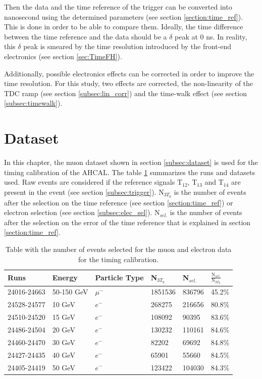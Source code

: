 Then the data and the time reference of the trigger can be converted into nanosecond using the determined parameters (see section \ref{section:time_ref}). This is done in order to be able to compare them. Ideally, the time difference between the time reference and the data should be a $\delta$ peak at 0 ns. In reality, this $\delta$ peak is smeared by the time resolution introduced by the front-end electronics (see section \ref{sec:TimeFH}).

Additionally, possible electronics effects can be corrected in order to improve the time resolution. For this study, two effects are corrected, the non-linearity of the TDC ramp (see section \ref{subsec:lin_corr}) and the time-walk effect (see section \ref{subsec:timewalk}).

\section{Dataset}

In this chapter, the muon dataset shown in section \ref{subsec:dataset} is used for the timing calibration of the AHCAL. The table \ref{table:mu_elec_runs} summarizes the runs and datasets used. Raw events are considered if the reference signals T$_{12}$, T$_{13}$ and T$_{14}$ are present in the event (see section \ref{subsec:trigger}). N$_{3 T_0}$ is the number of events after the selection on the time reference (see section \ref{section:time_ref}) or electron selection (see section \ref{subsec:elec_sel}). N$_{sel.}$ is the number of events after the selection on the error of the time reference that is explained in section \ref{section:time_ref}.

\begin{table}[htb!]
	\centering
	\caption{Table with the number of events selected for the muon and electron data for the timing calibration.}
	\label{table:mu_elec_runs}
	\begin{tabular}{@{} llllll @{}}
		\toprule
		Runs & Energy & Particle Type & N$_{3 T_0}$ & N$_{sel.}$ & $\frac{\text{N$_{sel.}$}}{\text{N$_{3 T_0}$}}$ \\
		\midrule
		24016-24663 & 50-150 GeV & $\mu^-$ & 1851536 & 836796 & 45.2\% \\
		\midrule
		24528-24577 & 10 GeV & $e^-$ & 268275 & 216656 & 80.8\% \\
		24510-24520 & 15 GeV & $e^-$ & 108092 & 90395 & 83.6\% \\
		24486-24504 & 20 GeV & $e^-$ & 130232 & 110161 & 84.6\% \\
		24460-24470 & 30 GeV & $e^-$ & 82202 & 69692 & 84.8\% \\
		24427-24435 & 40 GeV & $e^-$ & 65901 & 55660 & 84.5\% \\
		24405-24419 & 50 GeV & $e^-$ & 123422 & 104030 & 84.3\% \\
		\bottomrule
	\end{tabular}
\end{table}

